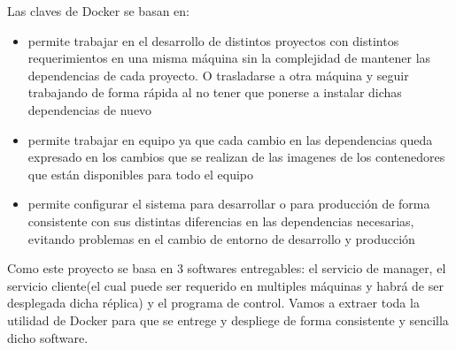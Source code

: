 Las claves de Docker se basan en:
\begin{itemize}
    \item permite trabajar en el desarrollo de distintos proyectos con distintos requerimientos en una misma máquina sin la complejidad de mantener las dependencias de cada proyecto. O trasladarse a otra máquina y seguir trabajando de forma rápida al no tener que ponerse a instalar dichas dependencias de nuevo
    \item permite trabajar en equipo ya que cada cambio en las dependencias queda expresado en los cambios que se realizan de las imagenes de los contenedores que están disponibles para todo el equipo
    \item permite configurar el sistema para desarrollar o para producción de forma consistente con sus distintas diferencias en las dependencias necesarias, evitando problemas en el cambio de entorno de desarrollo y producción
\end{itemize}

Como este proyecto se basa en 3 softwares entregables: el servicio de manager, el servicio cliente(el cual puede ser requerido en multiples máquinas y habrá de ser desplegada dicha réplica) y el programa de control. Vamos a extraer toda la utilidad de Docker para que se entrege y despliege de forma consistente y sencilla dicho software.